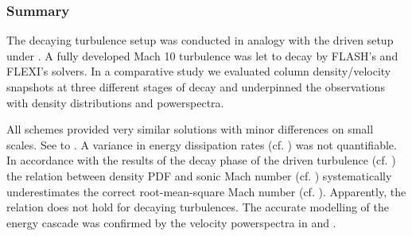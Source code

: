 
% 

\newpage

\subsubsection{Summary}
The decaying turbulence setup was conducted in analogy with the driven
setup under . A fully developed Mach 10 turbulence was
let to decay by FLASH's and FLEXI's solvers. In a comparative study
we evaluated column density/velocity snapshots at three different
stages of decay and underpinned the observations with density
distributions and powerspectra.

All schemes provided very similar solutions with minor differences on small
scales. See  to
.  A variance in energy dissipation rates
(cf. ) was not quantifiable.  In accordance
with the results of the decay phase of the driven turbulence (cf.
) the relation between density PDF and sonic Mach number (cf.
) systematically underestimates the correct
root-mean-square Mach number (cf.
). Apparently, the relation does
not hold for decaying turbulences. The accurate modelling of the energy cascade
was confirmed by the velocity powerspectra in
 and
.

